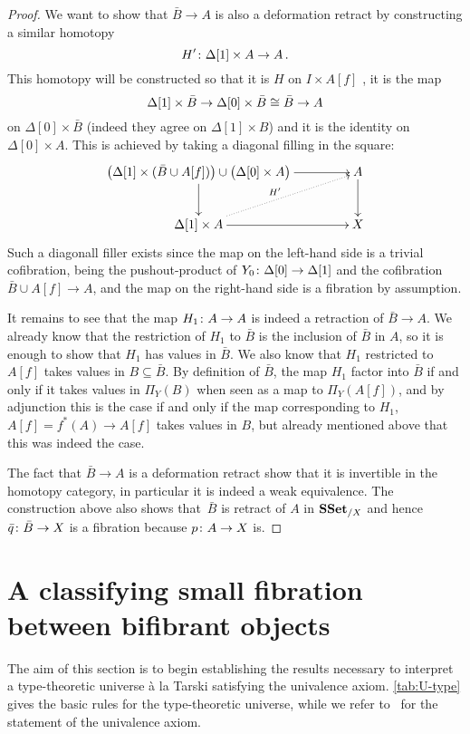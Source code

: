 \documentclass[reqno,10pt,a4paper,oneside,draft]{amsart}
\begin{document}
\begin{proof}
We want to show that $\bar{B} \rightarrow A$ is also a deformation retract by constructing a similar homotopy 
\[
H' \colon \Delta[1] \times A \rightarrow A \, .
\] 
This homotopy will be constructed so that it is $H$ on $I \times A[f]$ ,  it is the map 
\[
\Delta[1] \times \bar{B} \rightarrow \Delta[0]  \times \bar{B} \cong \bar{B} \rightarrow A
\] 
on $\Delta[0] \times \bar{B} $ (indeed they agree on $\Delta[1] \times B$) and it is the identity on $\Delta[0] \times A$.  This is achieved by taking a diagonal filling in the square:
\[
\xymatrix@C=1.5cm{
\big( \Delta[1] \times (\bar{B} \cup A[f]) \big)  \cup \big( \Delta[0] \times A \big) \ar[d] \ar[r] & A \ar[d] \\
\Delta[1] \times A \ar[r] \ar@{.>}[ur]^{H'} & X
}\]
Such a diagonall filler exists since the map on the left-hand side is a trivial cofibration, being the 
 pushout-product of $Y_0 \colon \Delta[0] \rightarrow \Delta[1]$ and the cofibration $\bar{B} \cup A[f] \rightarrow A$, and the map on the right-hand side is a fibration by assumption.

It remains to see that the map $H_{1} \colon A \rightarrow A$ is indeed a retraction of $\bar{B} \rightarrow A$. We already know that the restriction of $H_{1}$ to $\bar{B}$ is  the inclusion of $\bar{B}$ in $A$, so it is enough to show that $H_{1}$ has values in $\bar{B}$. We also know that $H_{1}$ restricted to $A[f]$ takes values in $B \subseteq \bar{B}$. By definition of $\bar{B}$, the map $H_1$ factor into $\bar{B}$ if and only if it takes values in $\Pi_Y(B)$ when seen as a map to $\Pi_Y(A[f])$, and by adjunction this is the case if and only if the map corresponding to $H_1$, $A[f]= f^*(A) \rightarrow A[f]$ takes values in $B$, but already mentioned above that this was indeed the case.

The fact that $\bar{B} \rightarrow A$ is a deformation retract show that it is invertible in the homotopy category, in particular it is indeed a weak equivalence. The construction above also shows that~$\bar{B}$ is retract of $A$ in $\mathbf{SSet}_{/X}$ and hence $\bar{q} \colon \bar{B} \rightarrow X$ is a fibration because $p \colon A \rightarrow X$ is.
\end{proof}

 

\section{A  classifying small fibration between bifibrant objects}
\label{sec:unifbb}


The aim of this section is to begin establishing the results necessary to interpret a type-theoretic universe
\`a la Tarski satisfying the univalence axiom. \cref{tab:U-type} gives the basic rules for the type-theoretic universe,
while we refer to~\cite{hottbook} for the statement of the univalence axiom. 
\end{document}
